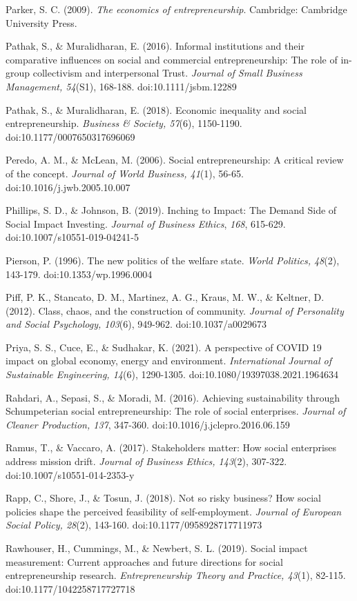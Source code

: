 \documentclass{article}
\begin{document}
Parker, S. C. (2009). \emph{The economics of entrepreneurship}. Cambridge: Cambridge University Press.

Pathak, S., \& Muralidharan, E. (2016). Informal institutions and their comparative influences on social and commercial entrepreneurship: The role of in-group collectivism and interpersonal Trust. \emph{Journal of Small Business Management, 54}(S1), 168-188. doi:10.1111/jsbm.12289

Pathak, S., \& Muralidharan, E. (2018). Economic inequality and social entrepreneurship. \emph{Business \& Society, 57}(6), 1150-1190. doi:10.1177/0007650317696069

Peredo, A. M., \& McLean, M. (2006). Social entrepreneurship: A critical review of the concept. \emph{Journal of World Business, 41}(1), 56-65. doi:10.1016/j.jwb.2005.10.007

Phillips, S. D., \& Johnson, B. (2019). Inching to Impact: The Demand Side of Social Impact Investing. \emph{Journal of Business Ethics}, \emph{168}, 615-629. doi:10.1007/s10551-019-04241-5

Pierson, P. (1996). The new politics of the welfare state. \emph{World Politics, 48}(2), 143-179. doi:10.1353/wp.1996.0004

Piff, P. K., Stancato, D. M., Martinez, A. G., Kraus, M. W., \& Keltner, D. (2012). Class, chaos, and the construction of community. \emph{Journal of Personality and Social Psychology, 103}(6), 949-962. doi:10.1037/a0029673

Priya, S. S., Cuce, E., \& Sudhakar, K. (2021). A perspective of COVID 19 impact on global economy, energy and environment. \emph{International Journal of Sustainable Engineering, 14}(6), 1290-1305. doi:10.1080/19397038.2021.1964634

Rahdari, A., Sepasi, S., \& Moradi, M. (2016). Achieving sustainability through Schumpeterian social entrepreneurship: The role of social enterprises. \emph{Journal of Cleaner Production, 137}, 347-360. doi:10.1016/j.jclepro.2016.06.159

Ramus, T., \& Vaccaro, A. (2017). Stakeholders matter: How social enterprises address mission drift. \emph{Journal of Business Ethics, 143}(2), 307-322. doi:10.1007/s10551-014-2353-y

Rapp, C., Shore, J., \& Tosun, J. (2018). Not so risky business? How social policies shape the perceived feasibility of self-employment. \emph{Journal of European Social Policy, 28}(2), 143-160. doi:10.1177/0958928717711973

Rawhouser, H., Cummings, M., \& Newbert, S. L. (2019). Social impact measurement: Current approaches and future directions for social entrepreneurship research. \emph{Entrepreneurship Theory and Practice, 43}(1), 82-115. doi:10.1177/1042258717727718
\end{document}
